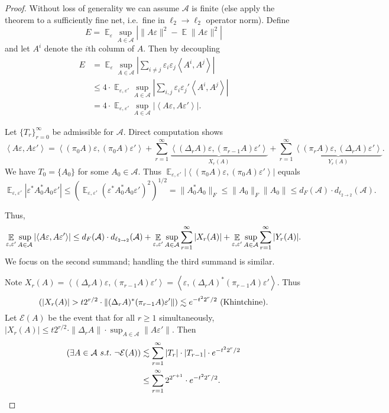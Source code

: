 \documentclass[12pt]{article}
\DeclareMathOperator*{\E}{\mathbb{E}}
\let\Pr\relax
\DeclareMathOperator*{\Pr}{\mathbb{P}}
\newcommand{\eps}{\varepsilon}
\newcommand{\inprod}[1]{\left\langle #1 \right\rangle}
\begin{document}
\begin{proof}
Without loss of generality we can assume $\mathcal{A}$ is finite (else apply the theorem to a sufficiently fine net, i.e.\ fine in $\ell_2\rightarrow\ell_2$ operator norm). Define
$$ E = \E_\eps \sup_{A\in\mathcal{A}} \left|\|A\eps\|^2 - \E\|A\eps\|^2\right| $$
and let $A^i$ denote the $i$th column of $A$. Then by decoupling
\allowdisplaybreaks
\begin{align*}
E &= \E_\eps \sup_{A\in\mathcal{A}} \left| \sum_{i\neq j} \eps_i \eps_j\inprod{A^i, A^j} \right| \\
{}& \le 4\cdot \E_{\eps,\eps'} \sup_{A\in\mathcal{A}} \left| \sum_{i,j}\eps_i \eps_j'\inprod{A^i, A^j} \right|\\ 
{}& = 4\cdot \E_{\eps,\eps'} \sup_{A\in\mathcal{A}} \left| \inprod{A\eps, A\eps'} \right| .
\end{align*}

Let $\{T_r\}_{r=0}^{\infty}$ be admissible for $\mathcal{A}$. Direct computation shows 
$$ \inprod{A\eps, A\eps'} = \inprod{(\pi_0 A)\eps, (\pi_0 A)\eps'} + \sum_{r=1}^\infty \underbrace{\inprod{(\Delta_r A)\eps, (\pi_{r-1} A)\eps'}}_{X_r(A)} + \sum_{r=1}^\infty \underbrace{\inprod{(\pi_r A)\eps, (\Delta_r A)\eps'}}_{Y_r(A)} .$$
We have $T_0 = \{A_0\}$ for some $A_0\in\mathcal{A}$. Thus $\E_{\eps,\eps'} \left|\inprod{(\pi_0 A)\eps, (\pi_0 A)\eps'}\right|$ equals
$$ \E_{\eps,\eps'} \left|\eps^* A_0^* A_0\eps'\right| \le \left(\E_{\eps,\eps'} \left(\eps^* A_0^* A_0 \eps' \right)^2\right)^{1/2} = \|A_0^* A_0\|_F \le \|A_0\|_F  \|A_0\| \le d_F(\mathcal{A})\cdot d_{\ell_{2\rightarrow 2}}(\mathcal{A}) .$$

Thus,
\begin{equation*}
 \E_{\eps, \eps'} \sup_{A\in\mathcal{A}} \left| \inprod{A\eps, A\eps'} \right| \le d_F(\mathcal{A})\cdot d_{\ell_{2\rightarrow 2}}(\mathcal{A}) + \E_{\eps,\eps'} \sup_{A\in\mathcal{A}} \sum_{r=1}^\infty |X_r(A)| + \E_{\eps,\eps'} \sup_{A\in\mathcal{A}} \sum_{r=1}^\infty |Y_r(A)| .\\
\end{equation*}
We focus on the second summand; handling the third summand is similar.

Note $X_r(A) = \inprod{(\Delta_r A)\eps, (\pi_{r-1} A)\eps'} = \inprod{\eps, (\Delta_r A)^* (\pi_{r-1} A)\eps'}$. Thus 
$$ \Pr(|X_r(A)| > t2^{r/2}\cdot \|(\Delta_r A)^* (\pi_{r-1} A)\eps'\|) \lesssim e^{-t^22^r / 2} \text{ (Khintchine)}.$$
Let $\mathcal{E}(A)$ be the event that for all $r\ge 1$ simultaneously, $|X_r(A)| \le t2^{r/2}\cdot \|\Delta_r A\| \cdot \sup_{A\in\mathcal{A}} \|A\eps'\|$. Then
\begin{align*}
\Pr(\exists A\in\mathcal{A}\ s.t.\ \neg \mathcal{E}(A)) &\lesssim \sum_{r=1}^\infty |T_r|\cdot |T_{r-1}| \cdot e^{-t^2 2^r/2} \\
{}&\le \sum_{r=1}^\infty 2^{2^{r+1}} \cdot e^{-t^22^r/2} .
\end{align*}


\end{proof}
\end{document}
